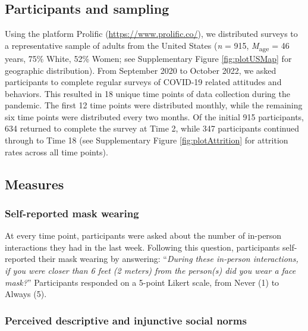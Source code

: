 \documentclass[
  man, donotrepeattitle,mask,floatsintext]{apa6}
\begin{document}
\hypertarget{participants-and-sampling}{%
\subsection{Participants and sampling}\label{participants-and-sampling}}

Using the platform Prolific (\url{https://www.prolific.co/}), we distributed surveys to a representative sample of adults from the United States (\emph{n} = 915, \emph{M}\textsubscript{age} = 46 years, 75\% White, 52\% Women; see Supplementary Figure \ref{fig:plotUSMap} for geographic distribution). From September 2020 to October 2022, we asked participants to complete regular surveys of COVID-19 related attitudes and behaviors. This resulted in 18 unique time points of data collection during the pandemic. The first 12 time points were distributed monthly, while the remaining six time points were distributed every two months. Of the initial 915 participants, 634 returned to complete the survey at Time 2, while 347 participants continued through to Time 18 (see Supplementary Figure \ref{fig:plotAttrition} for attrition rates across all time points).

\hypertarget{measures}{%
\subsection{Measures}\label{measures}}

\hypertarget{self-reported-mask-wearing}{%
\subsubsection{Self-reported mask wearing}\label{self-reported-mask-wearing}}

At every time point, participants were asked about the number of in-person interactions they had in the last week. Following this question, participants self-reported their mask wearing by answering: ``\emph{During these in-person interactions, if you were closer than 6 feet (2 meters) from the person(s) did you wear a face mask?}'' Participants responded on a 5-point Likert scale, from Never (1) to Always (5).

\hypertarget{perceived-descriptive-and-injunctive-social-norms}{%
\subsubsection{Perceived descriptive and injunctive social norms}\label{perceived-descriptive-and-injunctive-social-norms}}
\end{document}
